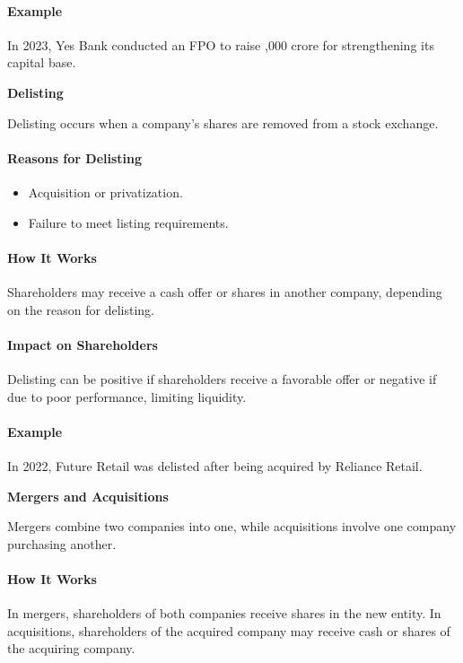 \documentclass[12pt]{article}
\begin{document}
\paragraph{Example}
In 2023, Yes Bank conducted an FPO to raise ,000 crore for strengthening its capital base.

\textbf{Delisting}

Delisting occurs when a company's shares are removed from a stock exchange.

\paragraph{Reasons for Delisting}
\begin{itemize}
    \item Acquisition or privatization.
    \item Failure to meet listing requirements.
\end{itemize}

\paragraph{How It Works}
Shareholders may receive a cash offer or shares in another company, depending on the reason for delisting.

\paragraph{Impact on Shareholders}
Delisting can be positive if shareholders receive a favorable offer or negative if due to poor performance, limiting liquidity.

\paragraph{Example}
In 2022, Future Retail was delisted after being acquired by Reliance Retail.

\textbf{Mergers and Acquisitions}

Mergers combine two companies into one, while acquisitions involve one company purchasing another.

\paragraph{How It Works}
In mergers, shareholders of both companies receive shares in the new entity. In acquisitions, shareholders of the acquired company may receive cash or shares of the acquiring company.
\end{document}
